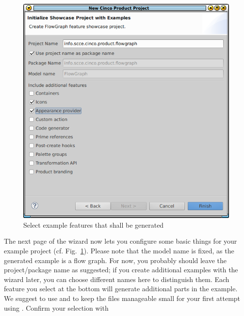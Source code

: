 \documentclass[a4paper,american,12pt]{scrreprt}
\begin{document}
\begin{figure}
	\centering
	\includegraphics[width=.5\textwidth]{screenshots/new-cp-wizard2.png}
	\caption{Select example features that shall be generated}
	\label{fig:cpWizard2}
\end{figure}

The next page of the wizard now lets you configure some basic things for your
example project (cf. Fig.~\ref{fig:cpWizard2}). Please note that the model name
is fixed, as the generated example is a flow graph. For now, you probably should leave
the project/package name as suggested; if you create additional examples with
the wizard later, you can choose different names here to distinguish them. Each
feature you select at the bottom will generate additional parts in the example.
We suggest to use  and  to keep the files
manageable small for your first attempt using \cinco{}. Confirm your
selection with 
\end{document}
